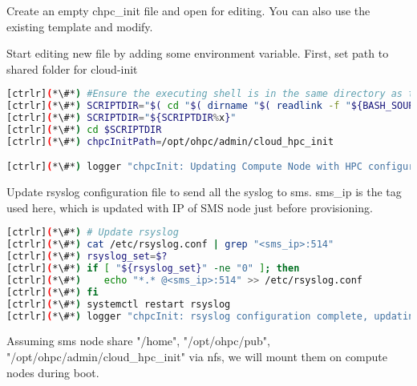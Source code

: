 	Create an empty chpc\_init file and open for editing. You can also use the existing template and modify. 

	Start editing new file by adding some environment variable. First, set path to shared folder for cloud-init


\begin{lstlisting}[language=bash,keywords={}]
[ctrlr](*\#*) #Ensure the executing shell is in the same directory as the script.
[ctrlr](*\#*) SCRIPTDIR="$( cd "$( dirname "$( readlink -f "${BASH_SOURCE[0]}" )" )" && pwd -P && echo x)"
[ctrlr](*\#*) SCRIPTDIR="${SCRIPTDIR%x}"
[ctrlr](*\#*) cd $SCRIPTDIR
[ctrlr](*\#*) chpcInitPath=/opt/ohpc/admin/cloud_hpc_init

[ctrlr](*\#*) logger "chpcInit: Updating Compute Node with HPC configuration"
\end{lstlisting}

	Update rsyslog configuration file to send all the syslog to sms. sms\_ip is the tag used here, which is updated with IP of SMS node just before provisioning.

\begin{lstlisting}[language=bash,keywords={}]
[ctrlr](*\#*) # Update rsyslog
[ctrlr](*\#*) cat /etc/rsyslog.conf | grep "<sms_ip>:514"
[ctrlr](*\#*) rsyslog_set=$?
[ctrlr](*\#*) if [ "${rsyslog_set}" -ne "0" ]; then
[ctrlr](*\#*)    echo "*.* @<sms_ip>:514" >> /etc/rsyslog.conf
[ctrlr](*\#*) fi
[ctrlr](*\#*) systemctl restart rsyslog
[ctrlr](*\#*) logger "chpcInit: rsyslog configuration complete, updating remaining HPC configuration"
\end{lstlisting}

	Assuming sms node share "/home", "/opt/ohpc/pub", "/opt/ohpc/admin/cloud\_hpc\_init" via nfs, we will mount them on compute nodes during boot.

